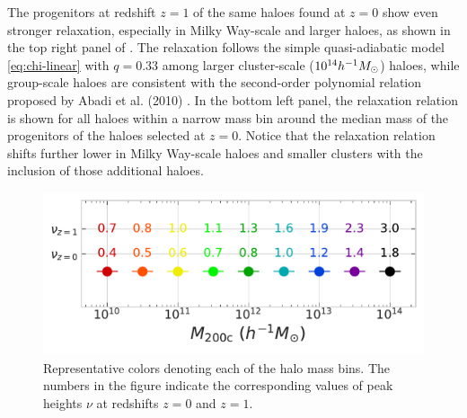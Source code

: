 The progenitors at redshift $z=1$ of the same haloes found at $z=0$ show even stronger relaxation, especially in Milky Way-scale and larger haloes, as shown in the top right panel of . The relaxation follows the simple quasi-adiabatic model \eqref{eq:chi-linear} with $q=0.33$ among larger cluster-scale ($10^{14} h^{-1}M_{\odot}$) haloes, while group-scale haloes are consistent with the second-order polynomial relation proposed by Abadi et al. (2010) \cite{2010MNRAS.407..435A}. In the bottom left panel, the relaxation relation is shown for all haloes within a narrow mass bin around the median mass of the progenitors of the haloes selected at $z=0$. Notice that the relaxation relation shifts further lower in Milky Way-scale haloes and smaller clusters with the inclusion of those additional haloes.

\begin{figure}[htbp]
\centering
\includegraphics[width=0.49\linewidth]{plots/Mass_bin_labels_z.pdf}
\caption{Representative colors denoting each of the halo mass bins. The numbers in the figure indicate the corresponding values of peak heights $\nu$ at redshifts $z=0$ and $z=1$.}
\label{fig:mass_bin_label}
\end{figure}

